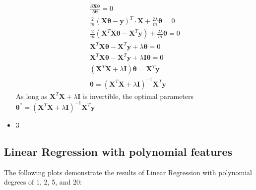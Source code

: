 \documentclass[a4paper]{article}
\begin{document}
\begin{itemize}
    \begin{align*}
      \frac{\partial \bm{X\theta}}{\partial \bm{\theta}} = 0 \\
      \frac{2}{m}(\bm{X\theta}-\bm{y})^T \cdot \bm{X} + \frac{2\lambda}{m}\bm{\theta} = 0 \\
      \frac{2}{m}(\bm{X}^T\bm{X\theta} - \bm{X}^T\bm{y}) + \frac{2\lambda}{m}\bm{\theta} = 0 \\
      \bm{X}^T\bm{X\theta} - \bm{X}^T\bm{y} + \lambda\bm{\theta} = 0 \\
      \bm{X}^T\bm{X\theta} - \bm{X}^T\bm{y} + \lambda\bm{I\theta} = 0 \\
      (\bm{X}^T\bm{X} + \lambda\bm{I})\bm{\theta} = \bm{X}^T\bm{y} \\
      \bm{\theta} = (\bm{X}^T\bm{X} + \lambda\bm{I})^{-1}\bm{X}^T\bm{y}
    \end{align*}
    As long as \(\bm{X}^T\bm{X} + \lambda\bm{I}\) is invertible, the optimal parameters
    \(\bm{\theta}^* = (\bm{X}^T\bm{X} + \lambda\bm{I})^{-1}\bm{X}^T\bm{y}\)
  \item 3
\end{itemize}

\subsection{Linear Regression with polynomial features}

The following plots demonstrate the results of Linear Regression with polynomial degrees of 1, 2, 5, and 20:
\end{document}

